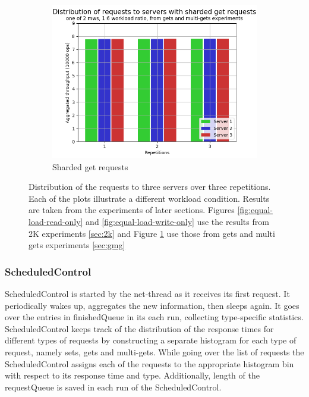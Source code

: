 \documentclass[11pt,a4paper]{article}
\begin{document}
\begin{figure}[h]
\begin{subfigure}{.33\textwidth}
  \centering
  \includegraphics[width=1.0\linewidth,trim={0px 0px 0px 0px},clip]{img/plot/equal-load-sharded-get.png}
  \caption{Sharded get requests}
  \label{fig:equal-load-sharded-get}
\end{subfigure}
\caption{Distribution of the requests to three servers over three repetitions. Each of the plots illustrate a different workload condition. Results are taken from the experiments of later sections. Figures \ref{fig:equal-load-read-only} and \ref{fig:equal-load-write-only} use the results from 2K experiments \ref{sec:2k} and Figure \ref{fig:equal-load-sharded-get} use those from gets and multi gets experiments \ref{sec:gmg}}
\label{fig:equal-load}
\end{figure}

\subsubsection{ScheduledControl} \label{sec:ov-scheduledcontrol}
ScheduledControl is started by the net-thread as it receives its first request. It periodically wakes up, aggregates the new information, then sleeps again. It goes over the entries in finishedQueue in its each run, collecting type-specific statistics. ScheduledControl keeps track of the distribution of the response times for different types of requests by constructing a separate histogram for each type of request, namely sets, gets and multi-gets. While going over the list of requests the ScheduledControl assigns each of the requests to the appropriate histogram bin with respect to its response time and type. Additionally, length of the requestQueue is saved in each run of the ScheduledControl.
\end{document}
